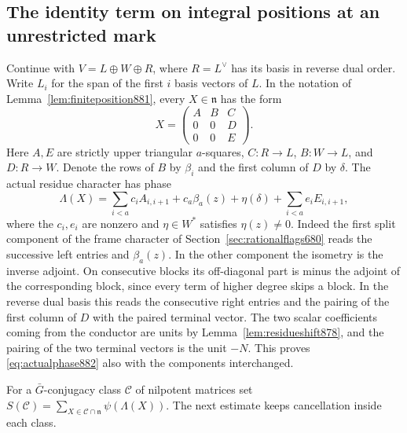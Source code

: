 \documentclass[a4paper,11pt]{article}
\theoremstyle{definition}
\theoremstyle{remark}
\numberwithin{equation}{section}
\begin{document}
\subsection{The identity term on integral positions at an unrestricted mark}
\label{sec:unrestrictedmass882}

Continue with \(V=L\oplus W\oplus R\), where \(R=L^\vee\) has
its basis in reverse dual order. Write \(L_i\) for the span of the
first \(i\) basis vectors of \(L\). In the notation of
Lemma~\ref{lem:finiteposition881}, every \(X\in\mathfrak n\) has
the form
\[
 X=\begin{pmatrix}A&B&C\\0&0&D\\0&0&E\end{pmatrix}.
\]
Here \(A,E\) are strictly upper triangular \(a\)-squares,
\(C:R\to L\), \(B:W\to L\), and \(D:R\to W\). Denote the
rows of \(B\) by \(\beta_i\) and the first column of \(D\) by
\(\delta\). The actual residue character has phase
\begin{equation}
 \Lambda(X)=\sum_{i<a}c_i A_{i,i+1}
       +c_a\beta_a(z)+\eta(\delta)
       +\sum_{i<a}e_i E_{i,i+1},
 \label{eq:actualphase882}
\end{equation}
where the \(c_i,e_i\) are nonzero and \(\eta\in W^*\) satisfies
\(\eta(z)\ne0\). Indeed the first split component of the frame
character of Section~\ref{sec:rationalflags680} reads the
successive left entries and \(\beta_a(z)\). In the other component
the isometry is the inverse adjoint. On consecutive blocks its
off-diagonal part is minus the adjoint of the corresponding
block, since every term of higher degree skips a block. In the
reverse dual basis this reads the consecutive right entries and
the pairing of the first column of \(D\) with the paired terminal
vector. The two scalar coefficients coming from the conductor are
units by Lemma~\ref{lem:residueshift878}, and the pairing of the
two terminal vectors is the unit \(-N\). This proves
\eqref{eq:actualphase882} also with the components interchanged.

For a \(\bar G\)-conjugacy class \(\mathcal C\) of nilpotent
matrices set \(S(\mathcal C)=\sum_{X\in\mathcal C\cap\mathfrak n}
\psi(\Lambda(X))\). The next estimate keeps cancellation inside
each class.
\end{document}
